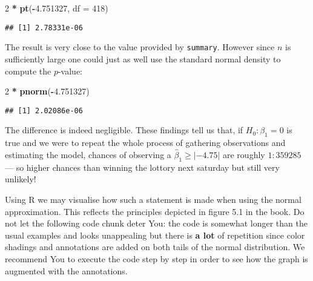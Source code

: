 \documentclass[]{book}
\newenvironment{Shaded}{\begin{snugshade}}{\end{snugshade}}
\newcommand{\KeywordTok}[1]{\textcolor[rgb]{0.13,0.29,0.53}{\textbf{#1}}}
\newcommand{\DataTypeTok}[1]{\textcolor[rgb]{0.13,0.29,0.53}{#1}}
\newcommand{\DecValTok}[1]{\textcolor[rgb]{0.00,0.00,0.81}{#1}}
\newcommand{\FloatTok}[1]{\textcolor[rgb]{0.00,0.00,0.81}{#1}}
\newcommand{\StringTok}[1]{\textcolor[rgb]{0.31,0.60,0.02}{#1}}
\newcommand{\OperatorTok}[1]{\textcolor[rgb]{0.81,0.36,0.00}{\textbf{#1}}}
\newcommand{\NormalTok}[1]{#1}
\theoremstyle{definition}
\theoremstyle{definition}
\theoremstyle{definition}
\theoremstyle{remark}
\begin{document}
\begin{Shaded}
\begin{Highlighting}[]
\DecValTok{2} \OperatorTok{*}\StringTok{ }\KeywordTok{pt}\NormalTok{(}\OperatorTok{-}\FloatTok{4.751327}\NormalTok{, }\DataTypeTok{df =} \DecValTok{418}\NormalTok{)}
\end{Highlighting}
\end{Shaded}

\begin{verbatim}
## [1] 2.78331e-06
\end{verbatim}

The result is very close to the value provided by \texttt{summary}.
However since \(n\) is sufficiently large one could just as well use the
standard normal density to compute the \(p\)-value:

\begin{Shaded}
\begin{Highlighting}[]
\DecValTok{2} \OperatorTok{*}\StringTok{ }\KeywordTok{pnorm}\NormalTok{(}\OperatorTok{-}\FloatTok{4.751327}\NormalTok{)}
\end{Highlighting}
\end{Shaded}

\begin{verbatim}
## [1] 2.02086e-06
\end{verbatim}

The difference is indeed negligible. These findings tell us that, if
\(H_0: \beta_1 = 0\) is true and we were to repeat the whole process of
gathering observations and estimating the model, chances of observing a
\(\hat\beta_1 \geq |-4.75|\) are roughly \(1:359285\) --- so higher
chances than winning the lottory next saturday but still very unlikely!

Using R we may visualise how such a statement is made when using the
normal approximation. This reflects the principles depicted in figure
5.1 in the book. Do not let the following code chunk deter You: the code
is somewhat longer than the usual examples and looks unappealing but
there is \textbf{a lot} of repetition since color shadings and
annotations are added on both tails of the normal distribution. We
recommend You to execute the code step by step in order to see how the
graph is augmented with the annotations.
\end{document}
